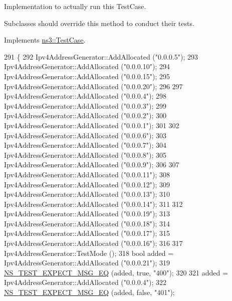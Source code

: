 Implementation to actually run this Test\+Case. 

Subclasses should override this method to conduct their tests. 

Implements \hyperlink{classns3_1_1TestCase_a8ff74680cf017ed42011e4be51917a24}{ns3\+::\+Test\+Case}.


\begin{DoxyCode}
291 \{
292   Ipv4AddressGenerator::AddAllocated (\textcolor{stringliteral}{"0.0.0.5"});
293   Ipv4AddressGenerator::AddAllocated (\textcolor{stringliteral}{"0.0.0.10"});
294   Ipv4AddressGenerator::AddAllocated (\textcolor{stringliteral}{"0.0.0.15"});
295   Ipv4AddressGenerator::AddAllocated (\textcolor{stringliteral}{"0.0.0.20"});
296 
297   Ipv4AddressGenerator::AddAllocated (\textcolor{stringliteral}{"0.0.0.4"});
298   Ipv4AddressGenerator::AddAllocated (\textcolor{stringliteral}{"0.0.0.3"});
299   Ipv4AddressGenerator::AddAllocated (\textcolor{stringliteral}{"0.0.0.2"});
300   Ipv4AddressGenerator::AddAllocated (\textcolor{stringliteral}{"0.0.0.1"});
301 
302   Ipv4AddressGenerator::AddAllocated (\textcolor{stringliteral}{"0.0.0.6"});
303   Ipv4AddressGenerator::AddAllocated (\textcolor{stringliteral}{"0.0.0.7"});
304   Ipv4AddressGenerator::AddAllocated (\textcolor{stringliteral}{"0.0.0.8"});
305   Ipv4AddressGenerator::AddAllocated (\textcolor{stringliteral}{"0.0.0.9"});
306 
307   Ipv4AddressGenerator::AddAllocated (\textcolor{stringliteral}{"0.0.0.11"});
308   Ipv4AddressGenerator::AddAllocated (\textcolor{stringliteral}{"0.0.0.12"});
309   Ipv4AddressGenerator::AddAllocated (\textcolor{stringliteral}{"0.0.0.13"});
310   Ipv4AddressGenerator::AddAllocated (\textcolor{stringliteral}{"0.0.0.14"});
311 
312   Ipv4AddressGenerator::AddAllocated (\textcolor{stringliteral}{"0.0.0.19"});
313   Ipv4AddressGenerator::AddAllocated (\textcolor{stringliteral}{"0.0.0.18"});
314   Ipv4AddressGenerator::AddAllocated (\textcolor{stringliteral}{"0.0.0.17"});
315   Ipv4AddressGenerator::AddAllocated (\textcolor{stringliteral}{"0.0.0.16"});
316 
317   Ipv4AddressGenerator::TestMode ();
318   \textcolor{keywordtype}{bool} added = Ipv4AddressGenerator::AddAllocated (\textcolor{stringliteral}{"0.0.0.21"});
319   \hyperlink{group__testing_ga7304ba46a28d8cf08dfdfd6499cf7068}{NS\_TEST\_EXPECT\_MSG\_EQ} (added, \textcolor{keyword}{true}, \textcolor{stringliteral}{"400"});
320 
321   added = Ipv4AddressGenerator::AddAllocated (\textcolor{stringliteral}{"0.0.0.4"});
322   \hyperlink{group__testing_ga7304ba46a28d8cf08dfdfd6499cf7068}{NS\_TEST\_EXPECT\_MSG\_EQ} (added, \textcolor{keyword}{false}, \textcolor{stringliteral}{"401"});

\end{DoxyCode}

